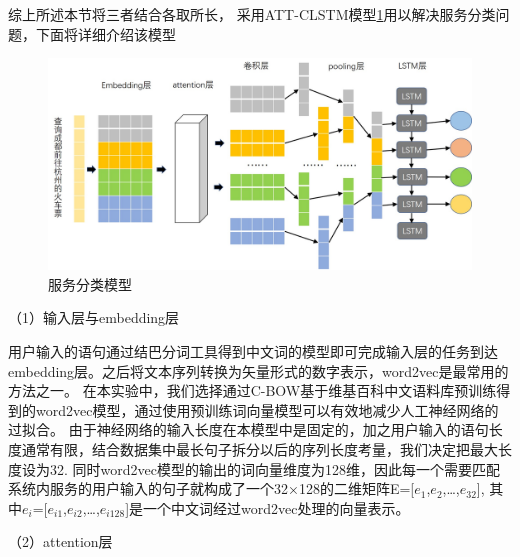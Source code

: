综上所述本节将三者结合各取所长， 采用ATT-CLSTM模型\ref{fig:cnn-lstm}用以解决服务分类问题，下面将详细介绍该模型

\begin{figure}[htbp]
    \centering
    \includegraphics[scale=0.5]{./images/cnn-lstm.jpg}
    \caption{服务分类模型}
    \label{fig:cnn-lstm}
  \end{figure}
  （1）输入层与embedding层

  用户输入的语句通过结巴分词工具得到中文词的模型即可完成输入层的任务到达embedding层。之后将文本序列转换为矢量形式的数字表示，word2vec是最常用的方法之一。
  在本实验中，我们选择通过C-BOW基于维基百科中文语料库预训练得到的word2vec模型，通过使用预训练词向量模型可以有效地减少人工神经网络的过拟合。
  由于神经网络的输入长度在本模型中是固定的，加之用户输入的语句长度通常有限，结合数据集中最长句子拆分以后的序列长度考量，我们决定把最大长度设为32.
  同时word2vec模型的输出的词向量维度为128维，因此每一个需要匹配系统内服务的用户输入的句子就构成了一个32×128的二维矩阵E=[$e_{1}$,$e_{2}$,\dots,$e_{32}$],
  其中$e_{i}$=[$e_{i1}$,$e_{i2}$,\dots,$e_{i128}$]是一个中文词经过word2vec处理的向量表示。

  （2）attention层

